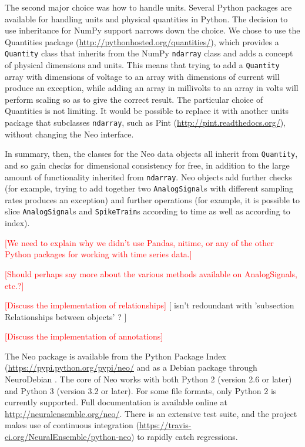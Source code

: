 \documentclass{frontiers}
\newcommand{\documentation}{\url{http://neuralensemble.org/neo/}}
\newcommand{\missing}[1]{\textcolor{red}{#1}}
\newcommand{\samuel}[1]{[\textcolor{RubineRed}{#1}]}
\begin{document}
The second major choice was how to handle units.
Several Python packages are available for handling units and physical quantities in Python.
The decision to use inheritance for NumPy support narrows down the choice.
We chose to use the Quantities package (\url{http://pythonhosted.org/quantities/}), which provides a \lstinline`Quantity` class that inherits from the NumPy \lstinline`ndarray` class and adds a concept of physical dimensions and units.
This means that trying to add a \lstinline`Quantity` array with dimensions of voltage to an array with dimensions of current will produce an exception, while adding an array in millivolts to an array in volts will perform scaling so as to give the correct result.
The particular choice of Quantities is not limiting.
It would be possible to replace it with another units package that subclasses \lstinline`ndarray`, such as Pint (\url{http://pint.readthedocs.org/}), without changing the Neo interface.

In summary, then, the classes for the Neo data objects all inherit from \lstinline`Quantity`, and so gain checks for dimensional consistency for free, in addition to the large amount of functionality inherited from \lstinline`ndarray`.
Neo objects add further checks (for example, trying to add together two \lstinline`AnalogSignal`s with different sampling rates produces an exception) and further operations (for example, it is possible to slice \lstinline`AnalogSignal`s and \lstinline`SpikeTrain`s according to time as well as according to index).

\missing{[We need to explain why we didn't use Pandas, nitime, or any of the other Python packages for working with time series data.]}

\missing{[Should perhaps say more about the various methods available on AnalogSignals, etc.?]}

\missing{[Discuss the implementation of relationships]}
\samuel{ isn't redoundant with  'subsection Relationships between objects' ? }

\missing{[Discuss the implementation of annotations]}

The Neo package is available from the Python Package Index (\url{https://pypi.python.org/pypi/neo/} and as a Debian package through NeuroDebian \citep{Halchenko2012}.
The core of Neo works with both Python 2 (version 2.6 or later) and Python 3 (version 3.2 or later).
For some file formats, only Python 2 is currently supported.
Full documentation is available online at \documentation.
There is an extensive test suite, and the project makes use of continuous integration (\url{https://travis-ci.org/NeuralEnsemble/python-neo}) to rapidly catch regressions.
\end{document}
